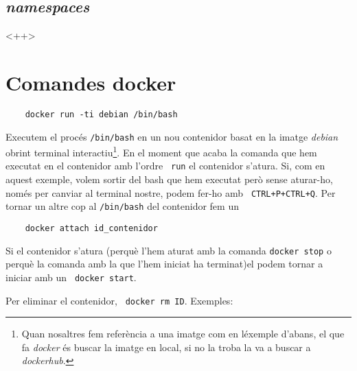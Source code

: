 \documentclass[a4paper]{article}
\begin{document}
\subsection{\textit{namespaces}}<++>

\section{Comandes docker}
\begin{lstlisting}
	docker run -ti debian /bin/bash
	\end{lstlisting}Executem el proc\'{e}s \verb!/bin/bash! en un nou contenidor basat en la imatge \textit{debian} obrint terminal interactiu\footnote{Quan nosaltres fem referència a una imatge com en l\'{e}xemple d'abans, el que fa \textit{docker} \'{e}s buscar la imatge en local, si no la troba la va a buscar a \textit{dockerhub}.}. En el moment que acaba la comanda que hem executat en el contenidor amb l'ordre \lstinline! run! el contenidor s'atura. Si, com en aquest exemple, volem sortir del bash que hem executat però sense aturar-ho, nom\'{e}s per canviar al terminal nostre, podem fer-ho amb \lstinline! CTRL+P+CTRL+Q!. Per tornar un altre cop al \verb+/bin/bash+ del contenidor fem un 

\begin{lstlisting}
	docker attach id_contenidor
\end{lstlisting}

Si el contenidor s'atura (perquè l'hem aturat amb la comanda \lstinline!docker stop! o perquè la comanda amb la que l'hem iniciat ha terminat)el podem tornar a iniciar amb un \lstinline! docker start!.

Per eliminar el contenidor, \lstinline! docker rm ID!. Exemples:
\end{document}
